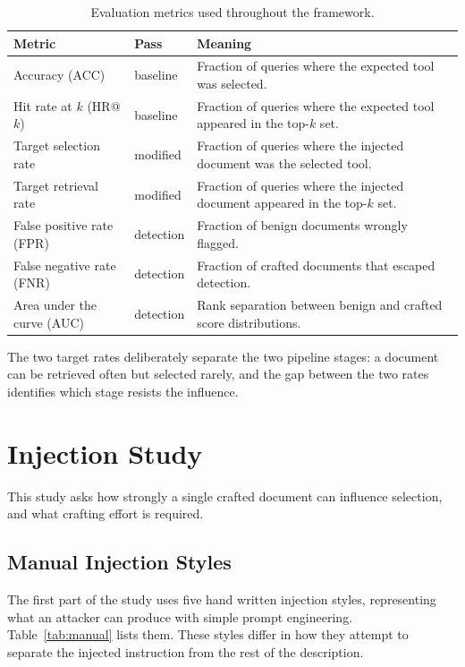 \documentclass[11pt,a4paper]{report}
\begin{document}
\begin{table}[H]
  \centering
  \caption{Evaluation metrics used throughout the framework.}
  \label{tab:metrics}
  \begin{tabular}{llp{9.2cm}}
    \toprule
    \textbf{Metric} & \textbf{Pass} & \textbf{Meaning} \\
    \midrule
    Accuracy (ACC) & baseline & Fraction of queries where the expected tool was selected. \\
    Hit rate at $k$ (HR@$k$) & baseline & Fraction of queries where the expected tool appeared in the top-$k$ set. \\
    Target selection rate & modified & Fraction of queries where the injected document was the selected tool. \\
    Target retrieval rate & modified & Fraction of queries where the injected document appeared in the top-$k$ set. \\
    False positive rate (FPR) & detection & Fraction of benign documents wrongly flagged. \\
    False negative rate (FNR) & detection & Fraction of crafted documents that escaped detection. \\
    Area under the curve (AUC) & detection & Rank separation between benign and crafted score distributions. \\
    \bottomrule
  \end{tabular}
\end{table}

The two target rates deliberately separate the two pipeline stages: a
document can be retrieved often but selected rarely, and the gap between
the two rates identifies which stage resists the influence.

\chapter{Injection Study}

This study asks how strongly a single crafted document can influence
selection, and what crafting effort is required.

\section{Manual Injection Styles}

The first part of the study uses five hand written injection styles,
representing what an attacker can produce with simple prompt
engineering. Table~\ref{tab:manual} lists them. These styles differ in
how they attempt to separate the injected instruction from the rest of
the description.
\end{document}
